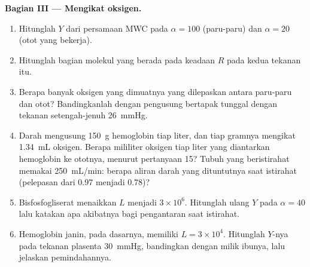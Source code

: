 \begin{problem}
\medskip
\noindent\textbf{Bagian III --- Mengikat oksigen.}
\begin{enumerate}[resume]
  \item Hitunglah $Y$ dari persamaan MWC pada $\alpha = 100$ (paru-paru) dan
        $\alpha = 20$ (otot yang bekerja).
  \item Hitunglah bagian molekul yang berada pada keadaan $R$ pada kedua
        tekanan itu.
  \item Berapa banyak oksigen yang dimuatnya yang dilepaskan antara paru-paru
        dan otot? Bandingkanlah dengan pengusung bertapak tunggal dengan
        tekanan setengah-jenuh \qty{26}{mmHg}.
  \item Darah mengusung \qty{150}{g} hemoglobin tiap liter, dan tiap gramnya
        mengikat \qty{1.34}{mL} oksigen. Berapa mililiter oksigen tiap liter
        yang diantarkan hemoglobin ke ototnya, menurut
        pertanyaan 15? Tubuh yang beristirahat memakai \qty{250}{mL/min}:
        berapa aliran darah yang dituntutnya saat istirahat (pelepasan dari
        $0.97$ menjadi $0.78$)?
  \item Bisfosfogliserat menaikkan $L$ menjadi $3\times 10^{6}$. Hitunglah
        ulang $Y$ pada $\alpha = 40$ lalu katakan apa akibatnya bagi
        pengantaran saat istirahat.
  \item Hemoglobin janin, pada dasarnya, memiliki $L = 3\times 10^{4}$.
        Hitunglah $Y$-nya pada tekanan plasenta \qty{30}{mmHg}, bandingkan
        dengan milik ibunya, lalu jelaskan pemindahannya.
\end{enumerate}


\end{problem}
